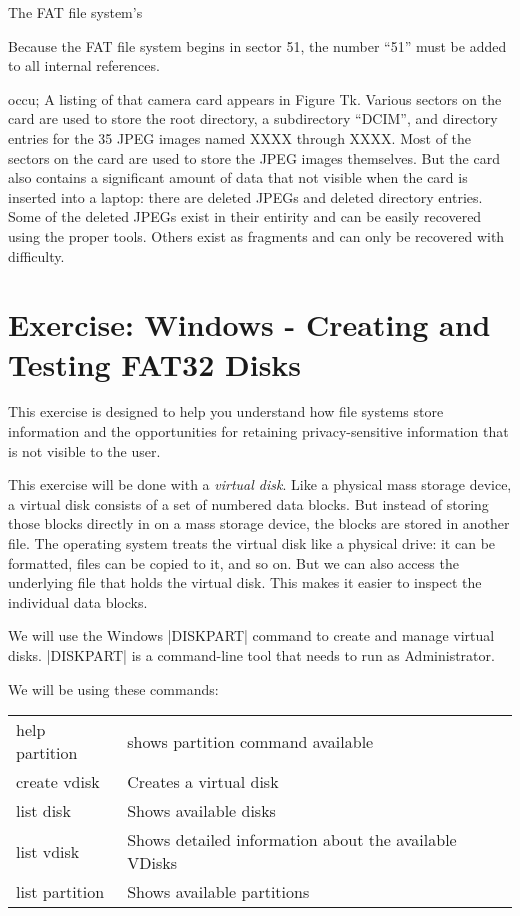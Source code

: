 The FAT file system's 

Because the FAT file system begins in sector 51, the number ``51''
must be added to all internal references.

occu; A listing of
that camera card appears in Figure Tk. Various sectors on the card are
used to store the root directory, a subdirectory ``DCIM'', and
directory entries for the 35 JPEG
images named XXXX through XXXX. Most of the sectors on the card are
used to store the JPEG images themselves. But the card also contains a
significant amount of data that not visible when the card is
inserted into a laptop: there are deleted JPEGs and deleted directory
entries. Some of the deleted JPEGs exist in their entirity and can be
easily recovered using the proper tools. Others exist as fragments and
can only be recovered with difficulty. 


\section{Exercise: Windows - Creating and Testing FAT32 Disks}

This exercise is designed to help you understand how file systems
store information and the opportunities for retaining
privacy-sensitive information that is not visible to the user. 

This exercise will be done with a \emph{virtual disk}. Like a physical
mass storage device, a virtual disk consists of a set of numbered data
blocks. But instead of storing those blocks directly in on a mass
storage device, the blocks are stored in another file. The operating
system treats the virtual disk like a physical drive: it can be
formatted, files can be copied to it, and so on. But we can also
access the underlying file that holds the virtual disk. This makes it
easier to inspect the individual data blocks.

We will use the Windows |DISKPART| command to create and manage virtual
disks. |DISKPART| is a command-line tool that needs to run as
Administrator.

We will be using these commands:
\begin{tabular}{ll}
help partition & shows partition command available\\
create vdisk & Creates a virtual disk \\
list disk & Shows available disks \\
list vdisk & Shows detailed information about the available VDisks\\
list partition & Shows available partitions \\
\end{tabular}

